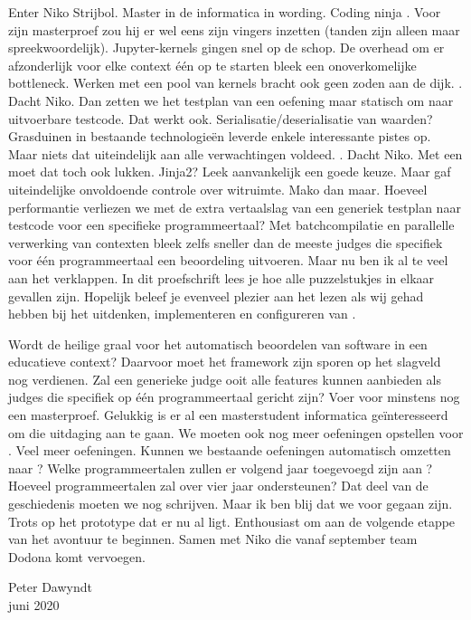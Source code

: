 Enter Niko Strijbol.
Master in de informatica in wording.
Coding ninja .
Voor zijn masterproef zou hij er wel eens zijn vingers inzetten (tanden zijn alleen maar spreekwoordelijk).
Jupyter-kernels gingen snel op de schop.
De overhead om er afzonderlijk voor elke context één op te starten bleek een onoverkomelijke bottleneck.
Werken met een pool van kernels bracht ook geen zoden aan de dijk.
.
Dacht Niko.
Dan zetten we het testplan van een oefening maar statisch om naar uitvoerbare testcode.
Dat werkt ook.
Serialisatie/deserialisatie van waarden?
Grasduinen in bestaande technologieën leverde enkele interessante pistes op.
Maar niets dat uiteindelijk aan alle verwachtingen voldeed.
.
Dacht Niko.
Met een  moet dat toch ook lukken.
Jinja2?
Leek aanvankelijk een goede keuze.
Maar gaf uiteindelijke onvoldoende controle over witruimte.
Mako dan maar.
Hoeveel performantie verliezen we met de extra vertaalslag van een generiek testplan naar testcode voor een specifieke programmeertaal?
Met batchcompilatie en parallelle verwerking van contexten bleek \tested{} zelfs sneller dan de meeste judges die specifiek voor één programmeertaal een beoordeling uitvoeren.
Maar nu ben ik al te veel aan het verklappen.
In dit proefschrift lees je hoe alle puzzelstukjes in elkaar gevallen zijn.
Hopelijk beleef je evenveel plezier aan het lezen als wij gehad hebben bij het uitdenken, implementeren en configureren van \tested{}.

Wordt \tested{} de heilige graal voor het automatisch beoordelen van software in een educatieve context?
Daarvoor moet het framework zijn sporen op het slagveld nog verdienen.
Zal een generieke judge ooit alle features kunnen aanbieden als judges die specifiek op één programmeertaal gericht zijn?
Voer voor minstens nog een masterproef.
Gelukkig is er al een masterstudent informatica geïnteresseerd om die uitdaging aan te gaan.
We moeten ook nog meer oefeningen opstellen voor \tested{}.
Veel meer oefeningen.
Kunnen we bestaande oefeningen automatisch omzetten naar \tested{}?
Welke programmeertalen zullen er volgend jaar toegevoegd zijn aan \tested{}?
Hoeveel programmeertalen zal \tested{} over vier jaar ondersteunen?
Dat deel van de geschiedenis moeten we nog schrijven.
Maar ik ben blij dat we voor \tested{} gegaan zijn.
Trots op het prototype dat er nu al ligt.
Enthousiast om aan de volgende etappe van het avontuur te beginnen.
Samen met Niko die vanaf september team Dodona komt vervoegen.

\begin{flushright}
    Peter Dawyndt\\
    juni 2020
\end{flushright}
